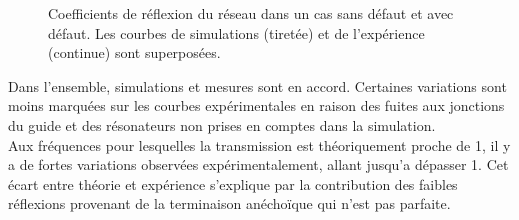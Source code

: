 \begin{figure}[!h]
	\centering
\caption{\label{ref_reflexion1} Coefficients de réflexion du réseau dans un cas sans défaut et avec défaut. Les courbes de simulations (tiretée) et de l’expérience (continue) sont superposées.}
\end{figure}

Dans l'ensemble, simulations et mesures sont en accord. Certaines variations sont moins marquées sur les courbes expérimentales en raison des fuites aux jonctions du guide et des résonateurs non prises en comptes dans la simulation.\\
Aux fréquences pour lesquelles la transmission est théoriquement proche de 1, il y a de fortes variations observées expérimentalement, allant jusqu'a dépasser 1. Cet écart entre théorie et expérience s'explique par la contribution des faibles réflexions provenant de la terminaison anéchoïque qui n'est pas parfaite.\\~\\


